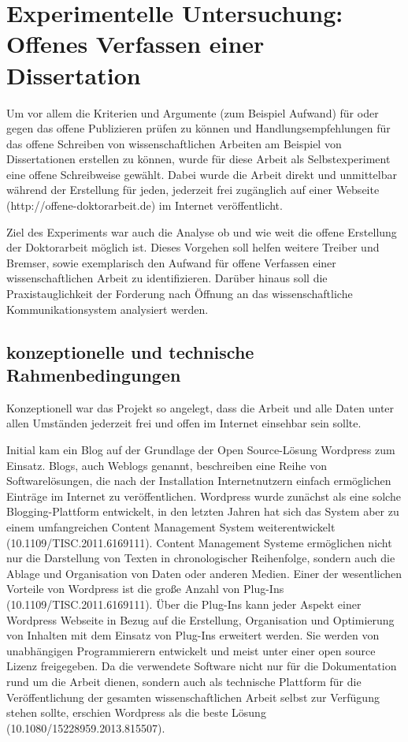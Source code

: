 \chapter{Experimentelle Untersuchung: Offenes Verfassen einer Dissertation}

Um vor allem die Kriterien und Argumente (zum Beispiel Aufwand) für oder gegen das offene Publizieren prüfen zu können und Handlungsempfehlungen für das offene Schreiben von wissenschaftlichen Arbeiten am Beispiel von Dissertationen erstellen zu können, wurde für diese Arbeit als Selbstexperiment eine offene Schreibweise gewählt. Dabei wurde die Arbeit direkt und unmittelbar während der Erstellung für jeden, jederzeit frei zugänglich auf einer Webseite (http://offene-doktorarbeit.de) im Internet veröffentlicht.

Ziel des Experiments war auch die Analyse ob und wie weit die offene Erstellung der Doktorarbeit möglich ist. Dieses Vorgehen soll helfen weitere Treiber und Bremser, sowie exemplarisch den Aufwand für offene Verfassen einer wissenschaftlichen Arbeit zu identifizieren. Darüber hinaus soll die Praxistauglichkeit der Forderung nach Öffnung an das wissenschaftliche Kommunikationsystem analysiert werden.

\section{konzeptionelle und technische Rahmenbedingungen}

Konzeptionell war das Projekt so angelegt, dass die Arbeit und alle Daten unter allen Umständen jederzeit frei und offen im Internet einsehbar sein sollte.

Initial kam ein Blog auf der Grundlage der Open Source-Lösung Wordpress zum Einsatz. Blogs, auch Weblogs genannt, beschreiben eine Reihe von Softwarelösungen, die nach der Installation Internetnutzern einfach ermöglichen Einträge im Internet zu veröffentlichen. Wordpress wurde zunächst als eine solche Blogging-Plattform entwickelt, in den letzten Jahren hat sich das System aber zu einem umfangreichen Content Management System weiterentwickelt (10.1109/TISC.2011.6169111). Content Management Systeme ermöglichen nicht nur die Darstellung von Texten in chronologischer Reihenfolge, sondern auch die Ablage und Organisation von Daten oder anderen Medien. Einer der wesentlichen Vorteile von Wordpress ist die große Anzahl von Plug-Ins (10.1109/TISC.2011.6169111). Über die Plug-Ins kann jeder Aspekt einer Wordpress Webseite in Bezug auf die Erstellung, Organisation und Optimierung von Inhalten mit dem Einsatz von Plug-Ins erweitert werden. Sie werden von unabhängigen Programmierern entwickelt und meist unter einer open source Lizenz freigegeben. Da die verwendete Software nicht nur für die Dokumentation rund um die Arbeit dienen, sondern auch als technische Plattform für die Veröffentlichung der gesamten wissenschaftlichen Arbeit selbst zur Verfügung stehen sollte, erschien Wordpress als die beste Lösung (10.1080/15228959.2013.815507).

